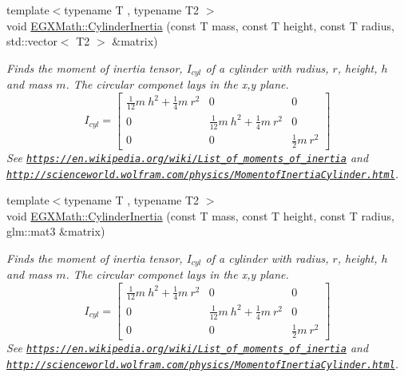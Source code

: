 \begin{DoxyCompactItemize}
{\footnotesize template$<$typename T , typename T2 $>$ }\\void \mbox{\hyperlink{group___e_g_x_math-_geometry-_cylinder_gac46dd57839cb2157d1bb6dd430d781ec}{E\+G\+X\+Math\+::\+Cylinder\+Inertia}} (const T mass, const T height, const T radius, std\+::vector$<$ T2 $>$ \&matrix)
\begin{DoxyCompactList}\small\item\em Finds the moment of inertia tensor, $I_{cyl}$ of a cylinder with radius, $r$, height, $h$ and mass $m$. The circular componet lays in the x,y plane. \[ I_{cyl}=\begin{bmatrix} \frac{1}{12}m\ h^2 + \frac{1}{4}m\ r^2 & 0 & 0\\ 0 & \frac{1}{12}m\ h^2 + \frac{1}{4}m\ r^2 & 0\\ 0 & 0 & \frac{1}{2}m\ r^2 \end{bmatrix} \] See \href{https://en.wikipedia.org/wiki/List_of_moments_of_inertia}{\tt https\+://en.\+wikipedia.\+org/wiki/\+List\+\_\+of\+\_\+moments\+\_\+of\+\_\+inertia} and \href{http://scienceworld.wolfram.com/physics/MomentofInertiaCylinder.html}{\tt http\+://scienceworld.\+wolfram.\+com/physics/\+Momentof\+Inertia\+Cylinder.\+html}. \end{DoxyCompactList}\item 
{\footnotesize template$<$typename T , typename T2 $>$ }\\void \mbox{\hyperlink{group___e_g_x_math-_geometry-_cylinder_ga5d9256549303e88a49b72e3d4c2c4a6d}{E\+G\+X\+Math\+::\+Cylinder\+Inertia}} (const T mass, const T height, const T radius, glm\+::mat3 \&matrix)
\begin{DoxyCompactList}\small\item\em Finds the moment of inertia tensor, $I_{cyl}$ of a cylinder with radius, $r$, height, $h$ and mass $m$. The circular componet lays in the x,y plane. \[ I_{cyl}=\begin{bmatrix} \frac{1}{12}m\ h^2 + \frac{1}{4}m\ r^2 & 0 & 0\\ 0 & \frac{1}{12}m\ h^2 + \frac{1}{4}m\ r^2 & 0\\ 0 & 0 & \frac{1}{2}m\ r^2 \end{bmatrix} \] See \href{https://en.wikipedia.org/wiki/List_of_moments_of_inertia}{\tt https\+://en.\+wikipedia.\+org/wiki/\+List\+\_\+of\+\_\+moments\+\_\+of\+\_\+inertia} and \href{http://scienceworld.wolfram.com/physics/MomentofInertiaCylinder.html}{\tt http\+://scienceworld.\+wolfram.\+com/physics/\+Momentof\+Inertia\+Cylinder.\+html}. \end{DoxyCompactList}\end{DoxyCompactItemize}


